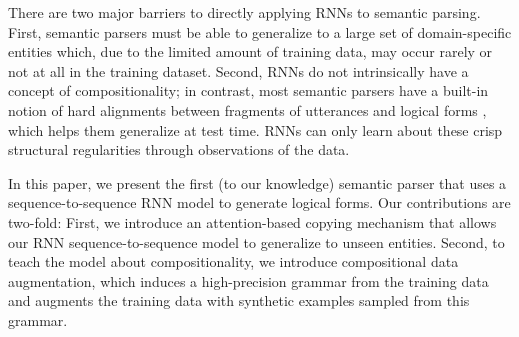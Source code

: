 \documentclass[11pt,letterpaper]{article}
\newcommand\pl[1]{}
\begin{document}
There are two major barriers to directly applying RNNs to semantic parsing.
First, semantic parsers must be able to generalize to a large set of 
domain-specific entities which, due to the limited
amount of training data, may occur rarely or not at all
in the training dataset.
Second, RNNs do not intrinsically have a concept of compositionality;
in contrast, most semantic parsers have a built-in notion of
hard alignments between fragments of utterances and logical forms
\cite{zettlemoyer05ccg,berant2013freebase},
which helps them generalize at test time.
RNNs can only learn about these crisp structural regularities
through observations of the data.


In this paper, we present the first (to our knowledge)
semantic parser that uses a sequence-to-sequence RNN model to generate
logical forms.  
Our contributions are two-fold:
First, we introduce an attention-based copying mechanism 
that allows our RNN sequence-to-sequence model to generalize to unseen entities.
Second, to teach the model about compositionality,
we introduce compositional data augmentation,
which induces a high-precision grammar from the training data
and augments the training data with synthetic examples sampled from this grammar.

\end{document}
